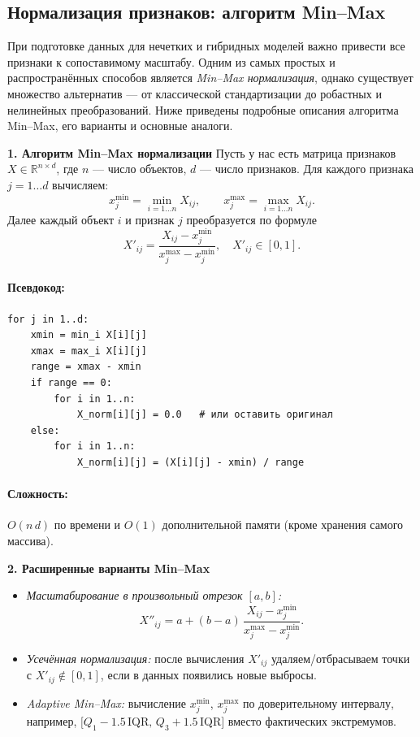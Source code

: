 \subsection{Нормализация признаков: алгоритм Min–Max}

При подготовке данных для нечетких и гибридных моделей важно привести все признаки к сопоставимому масштабу. Одним из самых простых и распространённых способов является \emph{Min–Max нормализация}, однако существует множество альтернатив — от классической стандартизации до робастных и нелинейных преобразований. Ниже приведены подробные описания алгоритма Min–Max, его варианты и основные аналоги.

\medskip
\noindent\textbf{1. Алгоритм Min–Max нормализации}  
Пусть у нас есть матрица признаков \(X \in \mathbb{R}^{n\times d}\), где \(n\) — число объектов, \(d\) — число признаков. Для каждого признака \(j = 1\ldots d\) вычисляем:
\[
  x_j^{\min} = \min_{i=1\ldots n} X_{i j},\qquad
  x_j^{\max} = \max_{i=1\ldots n} X_{i j}.
\]
Далее каждый объект \(i\) и признак \(j\) преобразуется по формуле
\[
  X'_{i j}
  = \frac{X_{i j} - x_j^{\min}}{x_j^{\max} - x_j^{\min}},
  \quad X'_{i j} \in [0,1].
\]
\paragraph{Псевдокод:}
\begin{verbatim}
for j in 1..d:
    xmin = min_i X[i][j]
    xmax = max_i X[i][j]
    range = xmax - xmin
    if range == 0:
        for i in 1..n:
            X_norm[i][j] = 0.0   # или оставить оригинал
    else:
        for i in 1..n:
            X_norm[i][j] = (X[i][j] - xmin) / range
\end{verbatim}
\paragraph{Сложность:} \(O(n\,d)\) по времени и \(O(1)\) дополнительной памяти (кроме хранения самого массива).

\medskip
\noindent\textbf{2. Расширенные варианты Min–Max}  
\begin{itemize}
  \item \emph{Масштабирование в произвольный отрезок \([a,b]\):}
    \[
      X''_{ij} = a + (b - a)\,\frac{X_{ij} - x_j^{\min}}{x_j^{\max} - x_j^{\min}}.
    \]
  \item \emph{Усечённая нормализация:} после вычисления \(X'_{ij}\) удаляем/отбрасываем точки с \(X'_{ij}\notin[0,1]\), если в данных появились новые выбросы.
  \item \emph{Adaptive Min–Max:} вычисление \(x_j^{\min}\), \(x_j^{\max}\) по доверительному интервалу, например, \(\bigl[Q_1 - 1.5\,\mathrm{IQR},\,Q_3 + 1.5\,\mathrm{IQR}\bigr]\) вместо фактических экстремумов.
\end{itemize}

